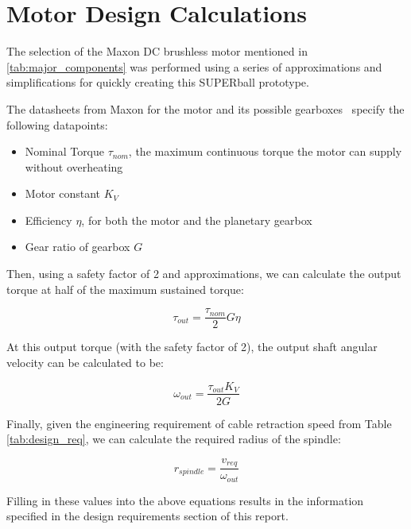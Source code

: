 \documentclass[12pt]{report}
\begin{document}

\appendix
\chapter{Motor Design Calculations}\label{sec:motor_calc}

The selection of the Maxon DC brushless motor mentioned in \ref{tab:major_components} was performed using a series of approximations and simplifications for quickly creating this SUPERball prototype.

The datasheets from Maxon for the motor and its possible gearboxes~\cite{maxon2014superballmotor,maxon2014superballgearhead} specify the following datapoints:

\begin{itemize}
  \setlength{\itemsep}{0cm}%
  \setlength{\parskip}{0cm}%
  \item Nominal Torque $\tau_{nom}$, the maximum continuous torque the motor can supply without overheating
  \item Motor constant $K_V$
  \item Efficiency $\eta$, for both the motor and the planetary gearbox
  \item Gear ratio of gearbox $G$
\end{itemize}

Then, using a safety factor of 2 and approximations, we can calculate the output torque at half of the maximum sustained torque:

\[
\tau_{out} = \frac{\tau_{nom}}{2} G \eta
\]

At this output torque (with the safety factor of 2), the output shaft angular velocity can be calculated to be:

\[
\omega_{out} = \frac{\tau_{out} K_{V}}{2G}
\]

Finally, given the engineering requirement of cable retraction speed from Table \ref{tab:design_req}, we can calculate the required radius of the spindle:

\[
r_{spindle} = \frac{v_{req}}{\omega_{out}}
\]

Filling in these values into the above equations results in the information specified in the design requirements section of this report.







\end{document}
